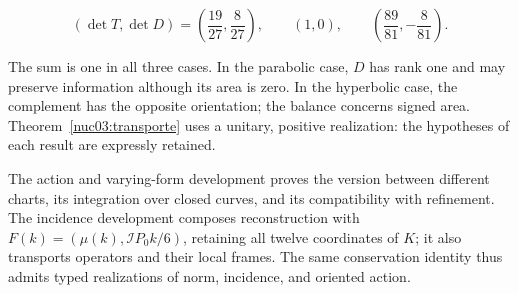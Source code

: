 \begin{equation}
(\det T,\det D)=
\left(\frac{19}{27},\frac8{27}\right),\qquad
(1,0),\qquad
\left(\frac{89}{81},-\frac8{81}\right).
\label{nuc03:eq:23}
\end{equation}

The sum is one in all three cases. In the parabolic case, \(D\) has rank one and may preserve information although its area is zero. In the hyperbolic case, the complement has the opposite orientation; the balance concerns signed area. Theorem~\ref{nuc03:transporte} uses a unitary, positive realization: the hypotheses of each result are expressly retained.

The action and varying-form development proves the version between different charts, its integration over closed curves, and its compatibility with refinement. The incidence development composes reconstruction with \(F(k)=(\mu(k),\mathcal I P_0k/6)\), retaining all twelve coordinates of \(K\); it also transports operators and their local frames. The same conservation identity thus admits typed realizations of norm, incidence, and oriented action.

